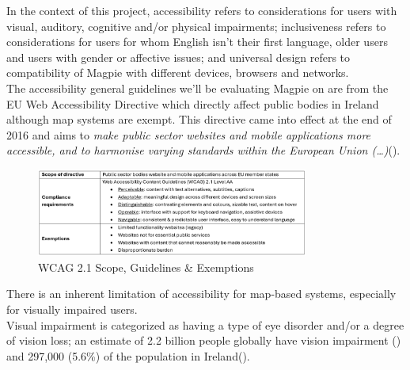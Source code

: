 In the context of this project, accessibility refers to considerations for users with visual, auditory, cognitive and/or physical impairments; inclusiveness refers to considerations for users for whom English isn't their first language, older users and users with gender or affective issues; and universal design refers to compatibility of Magpie with different devices, browsers and networks.\\

\noindent The accessibility general guidelines we'll be evaluating Magpie on are from the EU Web Accessibility Directive which directly affect public bodies in Ireland although map systems are exempt. This directive came into effect at the end of 2016 and aims to \emph{make public sector websites and mobile applications more accessible, and to harmonise varying standards within the European Union (\ldots)}(\cite{webaccessibilitydirective2016}).
\begin{figure}
    \centering
    \includegraphics[width=0.8\textwidth]{images/wcag-guidelines.png}
    \caption{WCAG 2.1 Scope, Guidelines \& Exemptions}
\end{figure}

\noindent There is an inherent limitation of accessibility for map-based systems, especially for visually impaired users.\\Visual impairment is categorized as having a type of eye disorder and/or a degree of vision loss; an estimate of 2.2 billion people globally have vision impairment (\cite{whoworldreportvision2019}) and 297,000 (5.6\%) of the population in Ireland(\cite{visionirelandcensus}).\\


